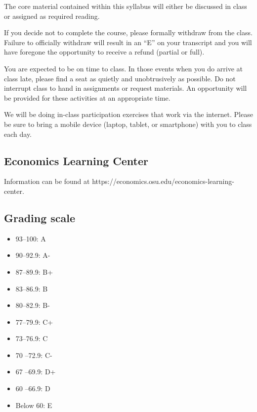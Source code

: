 \documentclass[12pt]{article}
\begin{document}
The core material contained within this syllabus will either be discussed in class or assigned as required reading.

If you decide not to complete the course, please formally withdraw from the class.
Failure to officially withdraw will result in an ``E'' on your transcript and you will have foregone the opportunity to receive a refund (partial or full).

You are expected to be on time to class.
In those events when you do arrive at class late, please find a seat as quietly and unobtrusively as possible.
Do not interrupt class to hand in assignments or request materials.
An opportunity will be provided for these activities at an appropriate time.

We will be doing in-class participation exercises that work via the internet.
Please be sure to bring a mobile device (laptop, tablet, or smartphone) with you to class each day.

\subsection*{Economics Learning Center}

Information can be found at https://economics.osu.edu/economics-learning-center.

\subsection*{Grading scale}
\begin{itemize}
    \item 93–100: A
    \item 90–92.9: A-
    \item 87–89.9: B+
    \item 83–86.9: B
    \item 80–82.9: B-
    \item 77–79.9: C+
    \item 73–76.9: C
    \item 70 –72.9: C-
    \item 67 –69.9: D+
    \item 60 –66.9: D
    \item Below 60: E
\end{itemize}







\printbibliography
\end{document}
